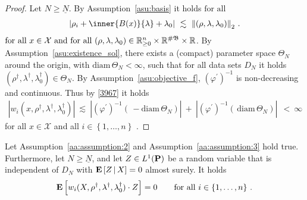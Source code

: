 \begin{proof}
  Let $N\ge \underline{N}$.
  By Assumption~\ref{asu:basis} it holds 
  $
    \text{for all}\ 
  $ 
  \begin{gather}
    \label{3967}
    \left| 
     \rho_i 
     +
      \inner{B(x)}{\lambda}
      +
      \lambda_0
    \right|
    \ 
    \lesssim
    \ 
    \norm{(\rho,\lambda,\lambda_0)}_2
    \,.
  \end{gather}
  $
    \text{for all}
    \ 
    x\in\mathcal{X}
    \
    \text{and for all}\ 
    (\rho,\lambda,\lambda_0)
    \in
  \R^n_{\ge 0}
  \times
  \R^{\#\mathfrak{B}}
  \times
  \R
  $.
  By Assumption~\ref{asu:existence_sol}, 
  there exists a (compact) parameter space
  $\Theta_N$ around the origin, with $\mathrm{diam}\,  \Theta_N<\infty$, 
  such that for all data sets $D_N$ it holds  $(\rho^\dagger,\lambda^\dagger,\lambda_0^\dagger)\in\Theta_N$.
  By Assumption~\ref{asu:objective_f}, $(\varphi^{'})^{-1}$ is non-decreasing and continuous. Thus
    by \eqref{3967} it holds
  \begin{align*}
    \left| 
  w_i(x,\rho^\dagger,\lambda^\dagger,\lambda_0^\dagger)
    \right|
    \ 
    \lesssim
    \ 
    \left| 
    (\varphi^{'})^{-1}
    \left( 
      \,
      -
      \mathrm{diam}\,\Theta_N
    \right)
    \right|
    \ 
    +
    \ 
    \left| 
    (\varphi^{'})^{-1}
    \left( 
      \,
      \mathrm{diam}\,\Theta_N
    \right)
    \right|
    \ 
    \ 
    <
    \ 
    \infty
  \end{align*}
  for all $x\in\mathcal{X}$
  and all $i\in \left\{ 1,\ldots,n \right\}$
  .
\end{proof}
\begin{lemma}
  \label{w.Z=0}
  Let Assumption~\ref{aa:assumption:2} and Assumption~\ref{aa:assumption:3} hold true.
  Furthermore, 
  let
  $N\ge\underline{N}$, and
  let
  $Z\in L^1(\P)$
  be a random variable that is independent of $D_N$ 
  with
  $
\E
\left[
  Z
  \,
  |
  \, 
  X
\right]
= 0
  $
  almost surely.
  It holds
  \begin{gather*}
  \E
  \left[
  w_i(X,\rho^\dagger,\lambda^\dagger,\lambda_0^\dagger)
  \cdot Z
  \right]
  =0
  \qquad
  \text{for all}
  \ 
  i\in \left\{ 1,\ldots,n \right\}
  \,.
  \end{gather*}
\end{lemma}

